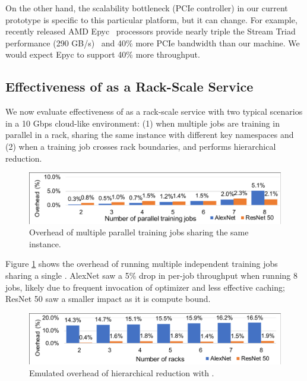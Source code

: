 On the other hand, the scalability bottleneck (PCIe controller) in our current prototype is specific to this particular platform, but it can change. For example, recently released AMD Epyc~\cite{AMDEpyc} processors provide nearly triple the Stream Triad performance
(290 GB/s)~\cite{EpycBenchmark} and 40\% more PCIe bandwidth than our
\pbox machine. We would expect Epyc to support 40\% more
throughput.


\subsection{Effectiveness of \pbox as a Rack-Scale Service}
\label{sec:hierarchicalEval}
We now evaluate effectiveness of \pbox as a rack-scale service with two typical scenarios in a 10 Gbps cloud-like environment: (1) when multiple jobs are training in parallel in a rack, sharing the same \pbox instance with different key namespaces and (2) when a training job crosses rack boundaries, and \phub performs hierarchical reduction.

\begin{figure}[t!]
    \centering
	\includegraphics[width=.7\linewidth,trim=2 2 2 2,clip]{Figures/MultijobSim.pdf}
	\caption{Overhead of multiple parallel training jobs sharing the same \pbox instance.}
	\label{fig:multijobs}
\end{figure}

Figure \ref{fig:multijobs} shows the overhead of running multiple independent training jobs sharing a single \pbox. AlexNet saw a 5\% drop in per-job throughput when running 8 jobs, likely due to frequent invocation of optimizer and less effective caching; ResNet 50 saw a smaller impact as it is compute bound.

\begin{figure}[t!]
    \centering
	\includegraphics[width=.7\linewidth,trim=2 6 2 2,clip]{Figures/HierarchicalSim.pdf}
	\caption{Emulated overhead of hierarchical reduction with \pbox.}
	\label{fig:hierarchical}
\end{figure}

